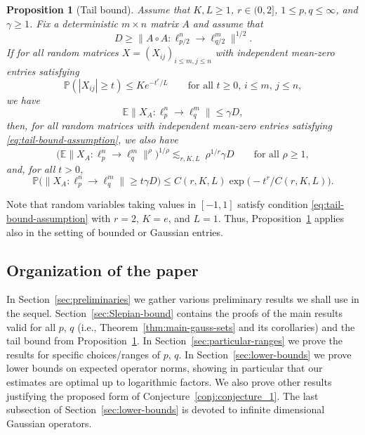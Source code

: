\documentclass[a4paper]{amsart}
\newtheorem{proposition}[theorem]{Proposition} %
\theoremstyle{definition}
\theoremstyle{remark}
\numberwithin{equation}{section}
\newcommand*{\EE}{\mathbb{E}}
\newcommand*{\PP}{\mathbb{P}}
\newcommand*{\hadprod}{\mathbin{\circ}} %
\begin{document}
\begin{proposition}[Tail bound]
\label{prop:tail-bounds}
	Assume that $K,L \ge 1$, $r\in(0,2]$, $1\leq p,q \leq \infty$, and $\gamma\ge 1$.
	Fix a deterministic $m\times n$ matrix $A$ and assume that
	\[
	D \ge \|A\hadprod A \colon \ell^n_{p/2} \to \ell^m_{q/2}\|^{1/2} .
	\]
	 If for all random matrices  $X=(X_{ij})_{i\leq m, j\leq n}$ with independent mean-zero entries satisfying
	\begin{equation}	\label{eq:tail-bound-assumption}
	\PP(|X_{ij}|\ge t) \le Ke^{-t^r/L} \qquad \text{for all } t\ge 0,\, i\leq m,\, j\leq n,
	\end{equation}
	we have
	\begin{equation}		\label{eq:tail-bound-assumption-bound}
		\EE \|X_A \colon \ell^n_p\to \ell^m_q\|
		 \leq \gamma D,
	 \end{equation}
	 then, for all random matrices with independent  mean-zero entries satisfying \eqref{eq:tail-bound-assumption}, we also have
	 \begin{equation}	\label{eq:tail-bound-moments}
		\bigl( \EE \|X_A \colon \ell^n_p\to \ell^m_q\|^\rho  \bigr)^{1/\rho}
		 \lesssim_{r,K,L} \ \rho^{1/r}\gamma D
		  \qquad \text{for all } \rho \ge 1,
	 \end{equation}
	 and, for all $t>0$,
	 \begin{equation}	\label{eq:tail-bound}
		\PP \bigl(  \|X_A \colon \ell^n_p\to \ell^m_q\| \ge t\gamma D  \bigr)
		  \leq C(r,K,L)	\exp\bigl( -t^r/C(r,K,L)\bigr).
	 \end{equation}
\end{proposition}

Note that
random variables taking values in $[-1,1]$ satisfy condition \eqref{eq:tail-bound-assumption} with $r=2$, $K=e$, and $L=1$.
Thus, Proposition~\ref{prop:tail-bounds} applies also in the setting of bounded or Gaussian entries.



%
\subsection{Organization of the paper}
%
In Section~\ref{sec:preliminaries} we gather various preliminary results we shall use in the sequel. Section~\ref{sec:Slepian-bound} contains the proofs of the main results valid for all $p$, $q$
(i.e., Theorem~\ref{thm:main-gauss-sets} and its corollaries) and the tail bound from Proposition~\ref{prop:tail-bounds}.
In Section~\ref{sec:particular-ranges} we prove the results for specific choices/ranges of $p$, $q$.
In Section~\ref{sec:lower-bounds} we prove lower bounds on expected operator norms, showing in particular that  our estimates are optimal up to logarithmic factors. We also prove other results justifying the proposed form of Conjecture~\ref{conj:conjecture_1}. The last subsection of Section~\ref{sec:lower-bounds} is devoted to infinite dimensional Gaussian operators.
\end{document}
